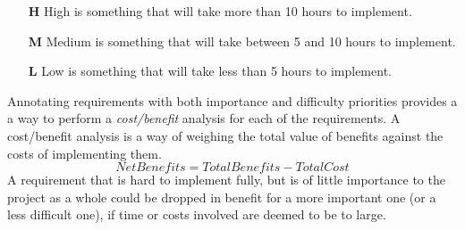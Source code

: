 \vspace{0.5cm}
\begin{itemize}
    \item[\textbf{H}]{High is something that will take more than 10 hours to implement.}
    \item[\textbf{M}]{Medium is something that will take between 5 and 10 hours to implement.}
    \item[\textbf{L}]{Low is something that will take less than 5 hours to implement.}
\end{itemize}
\vspace{0.5cm}
Annotating requirements with both importance and difficulty priorities provides a a way to perform a \emph{cost/benefit} analysis for each of the requirements. A cost/benefit analysis is a way of weighing the total value of benefits against the costs of implementing them\citep{cellini2010cost}.
\begin{equation}
Net Benefits = Total Benefits - Total Cost
\end{equation}
A requirement that is hard to implement fully, but is of little importance to the project as a whole could be dropped in benefit for a more important one (or a less difficult one), if time or costs involved are deemed to be to large.

